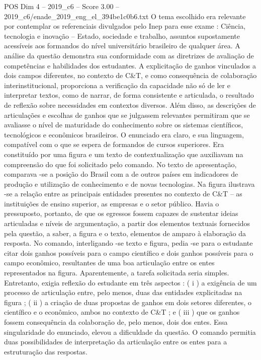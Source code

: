 \begin{textsample}{POS Dim 4 – 2019\_c6 – Score 3.00 – 2019\_c6/enade\_2019\_eng\_el\_394be1c0b6.txt}
O tema escolhido era relevante por contemplar os referenciais divulgados pelo Inep para esse exame : Ciência, tecnologia e inovação – Estado, sociedade e trabalho, assuntos supostamente acessíveis aos formandos do nível universitário brasileiro de qualquer área.
A análise da questão demonstra sua conformidade com as diretrizes de avaliação de competências e habilidades dos estudantes.
A explicitação de ganhos vinculados a dois campos diferentes, no contexto de C\&T, e como consequência de colaboração interinstitucional, proporciona a verificação da capacidade não só de ler e interpretar textos, como de narrar, de forma consistente e articulada, o resultado de reflexão sobre necessidades em contextos diversos.
Além disso, as descrições de articulações e escolhas de ganhos que se julgassem relevantes permitiram que se avaliasse o nível de maturidade do conhecimento sobre os sistemas científicos, tecnológicos e econômicos brasileiros.
O enunciado era claro, e sua linguagem, compatível com o que se espera de formandos de cursos superiores.
Era constituído por uma figura e um texto de contextualização que auxiliavam na compreensão do que foi solicitado pelo comando.
No texto de apresentação, comparava -se a posição do Brasil com a de outros países em indicadores de produção e utilização de conhecimento e de novas tecnologias.
Na figura ilustrava -se a relação entre as principais entidades presentes no contexto de C\&T – as instituições de ensino superior, as empresas e o setor público.
Havia o pressuposto, portanto, de que os egressos fossem capazes de sustentar ideias articuladas e níveis de argumentação, a partir dos elementos textuais fornecidos pela questão, a saber, a figura e o texto, elementos de amparo à elaboração da resposta.
No comando, interligando -se texto e figura, pedia -se para o estudante citar dois ganhos possíveis para o campo científico e dois ganhos possíveis para o campo econômico, resultantes de uma boa articulação entre os entes representados na figura.
Aparentemente, a tarefa solicitada seria simples.
Entretanto, exigia reflexão do estudante em três aspectos : ( i ) a exigência de um processo de articulação entre, pelo menos, duas das entidades explicitadas na figura ; ( ii ) a criação de duas propostas de ganhos em dois setores diferentes, o científico e o econômico, ambos no contexto de C\&T ; e ( iii ) que os ganhos fossem consequência da colaboração de, pelo menos, dois dos entes.
Essa singularidade do enunciado, elevou a dificuldade da questão.
O comando permitia duas possibilidades de interpretação da articulação entre os entes para a estruturação das respostas.

\end{textsample}
